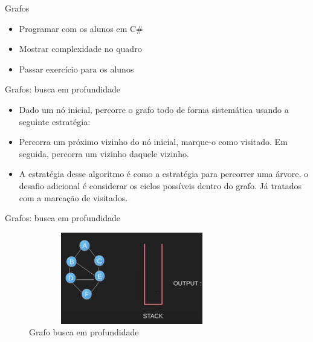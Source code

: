 \begin{frame}
	\begin{block}{Grafos}
		\begin{itemize}
			\item Programar com os alunos em C\#	
			\item Mostrar complexidade no quadro	
			\item Passar exercício para os alunos
		\end{itemize}
	\end{block}
\end{frame}

\begin{frame}
	\begin{block}{Grafos: busca em profundidade}
		\begin{itemize}
			\item Dado um nó inicial, percorre o grafo todo de forma sistemática usando a seguinte estratégia:
			\item Percorra um próximo vizinho do nó inicial, marque-o como visitado. Em seguida, percorra um vizinho daquele vizinho.
			\item A estratégia desse algoritmo é como a estratégia para percorrer uma árvore, o desafio adicional é considerar os ciclos possíveis dentro do grafo. Já tratados com a marcação de visitados.
		\end{itemize}
	\end{block}
\end{frame}


\begin{frame}
	\begin{block}{Grafos: busca em profundidade}
		\begin{figure}[!htb]
			\centering	  
			\includegraphics[height=4cm, width = 9cm]{./pic/dfs1.png}
			\caption{Grafo busca em profundidade \cite{GEEKS_2018}}
		\end{figure}
	\end{block}
\end{frame}


